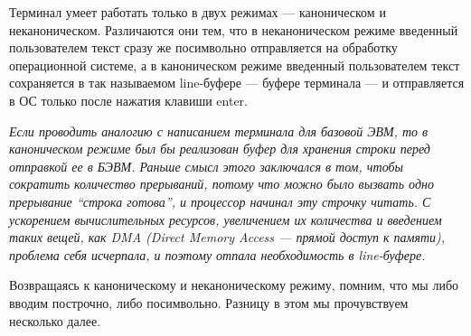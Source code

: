 Терминал умеет работать только в двух режимах --- каноническом и неканоническом. Различаются они тем, что в неканоническом режиме введенный пользователем текст сразу же посимвольно отправляется на обработку операционной системе, а в каноническом режиме введенный пользователем текст сохраняется в так называемом line-буфере --- буфере терминала --- и отправляется в ОС только после нажатия клавиши enter.

\textit{Если проводить аналогию с написанием терминала для базовой ЭВМ, то в каноническом режиме был бы реализован буфер для хранения строки перед отправкой ее в БЭВМ. Раньше смысл этого заключался в том, чтобы сократить количество прерываний, потому что можно было вызвать одно прерывание “строка готова”, и процессор начинал эту строчку читать. С ускорением вычислительных ресурсов, увеличением их количества и введением таких вещей, как DMA (Direct Memory Access --- прямой доступ к памяти), проблема себя исчерпала, и поэтому отпала необходимость в line-буфере.
}

Возвращаясь к каноническому и неканоническому режиму, помним, что мы либо вводим построчно, либо посимвольно. Разницу в этом мы прочувствуем несколько далее.